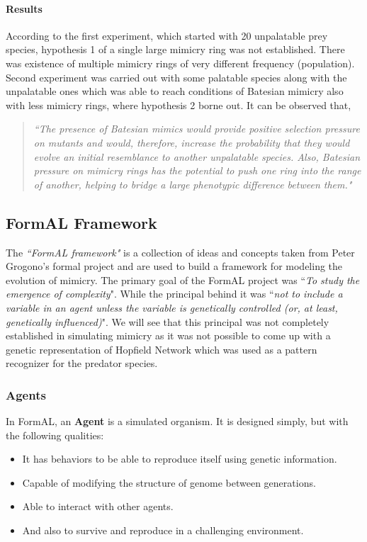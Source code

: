 \documentclass[letterpaper]{article}
\numberwithin{equation}{section}
\begin{document}
\paragraph{Results}
According to the first experiment, which started with 20 unpalatable prey species, hypothesis 1 of a single large mimicry ring was not established. There was existence of multiple mimicry rings of very different frequency (population). Second experiment was carried out with some palatable species along with the unpalatable ones which was able to reach conditions of Batesian mimicry also with less mimicry rings, where hypothesis 2 borne out. It can be observed that,

\begin{quote}
\textsl{``The presence of Batesian mimics would provide positive selection pressure on mutants and would, therefore, increase the probability that they would evolve an initial resemblance to another unpalatable species. Also, Batesian pressure on mimicry rings has the potential to push one ring into the range of another, helping to bridge a large phenotypic difference between them." \cite{franks2003}}
\end{quote}

\subsection{FormAL Framework}
The \textsl{``FormAL framework"} is a collection of ideas and concepts taken from Peter Grogono's \gls{formal} project \cite{grogono2003} and are used to build a framework for modeling the evolution of mimicry. The primary goal of the FormAL project was ``\textit{To study the emergence of complexity}". While the principal behind it was ``\textit{not to include a variable in an agent unless the variable is genetically controlled (or, at least, genetically influenced)}". We will see that this principal was not completely established in simulating mimicry as it was not possible to come up with a genetic representation of Hopfield Network which was used as a pattern recognizer for the predator species. 

\subsubsection{Agents}
In FormAL, an \textbf{Agent} is a simulated organism. It is designed simply, but with the following qualities:

\begin{itemize}
	\item It has behaviors to be able to reproduce itself using genetic information.
	\item Capable of modifying the structure of genome between generations.
	\item Able to interact with other agents.
	\item And also to survive and reproduce in a challenging environment.
\end{itemize}
\end{document}
